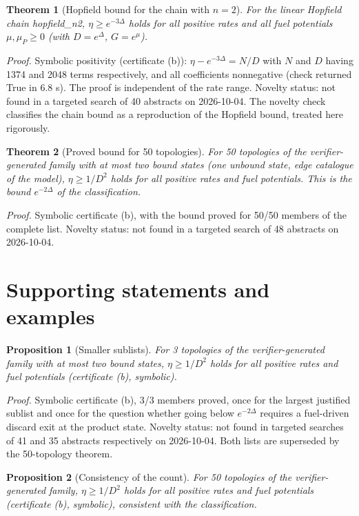 \documentclass[10pt,twocolumn]{article}
\newtheorem{theorem}{Theorem}\newtheorem{proposition}{Proposition}\newtheorem{lemma}{Lemma}\newtheorem{corollary}{Corollary}
\theoremstyle{definition}\newtheorem{definition}{Definition}\newtheorem{example}{Example}
\begin{document}
\begin{theorem}[Hopfield bound for the chain with $n=2$]
For the linear Hopfield chain hopfield\_n2, \(\eta \geq e^{-3\Delta}\) holds for all positive rates and all fuel potentials \(\mu, \mu_P \geq 0\) (with \(D = e^{\Delta}\), \(G = e^{\mu}\)).
\end{theorem}

\emph{Proof.} Symbolic positivity (certificate (b)): \(\eta - e^{-3\Delta} = N/D\) with \(N\) and \(D\) having 1374 and 2048 terms respectively, and all coefficients nonnegative (check returned True in 6.8 s). The proof is independent of the rate range. Novelty status: not found in a targeted search of 40 abstracts on 2026-10-04. The novelty check classifies the chain bound as a reproduction of the Hopfield bound, treated here rigorously.

\begin{theorem}[Proved bound for 50 topologies]
For 50 topologies of the verifier-generated family with at most two bound states (one unbound state, edge catalogue of the model), \(\eta \geq 1/D^2\) holds for all positive rates and fuel potentials. This is the bound \(e^{-2\Delta}\) of the classification.
\end{theorem}

\emph{Proof.} Symbolic certificate (b), with the bound proved for 50/50 members of the complete list. Novelty status: not found in a targeted search of 48 abstracts on 2026-10-04.

\section{Supporting statements and examples}\label{supporting-statements-and-examples}

\begin{proposition}[Smaller sublists]
For 3 topologies of the verifier-generated family with at most two bound states, \(\eta \geq 1/D^2\) holds for all positive rates and fuel potentials (certificate (b), symbolic).
\end{proposition}

\emph{Proof.} Symbolic certificate (b), 3/3 members proved, once for the largest justified sublist and once for the question whether going below \(e^{-2\Delta}\) requires a fuel-driven discard exit at the product state. Novelty status: not found in targeted searches of 41 and 35 abstracts respectively on 2026-10-04. Both lists are superseded by the 50-topology theorem.

\begin{proposition}[Consistency of the count]
For 50 topologies of the verifier-generated family, \(\eta \geq 1/D^2\) holds for all positive rates and fuel potentials (certificate (b), symbolic), consistent with the classification.
\end{proposition}
\end{document}
